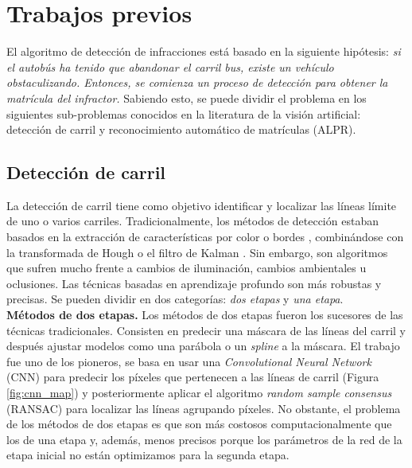 \documentclass[a4paper, oneside, onecolumn, 11pt]{article}
\begin{document}
\section{Trabajos previos}

El algoritmo de detección de infracciones está basado en la siguiente hipótesis: \textit{si el autobús ha tenido que abandonar el carril bus, existe un vehículo obstaculizando. Entonces, se comienza un proceso de detección para obtener la matrícula del infractor.} Sabiendo esto, se puede dividir el problema en los siguientes sub-problemas conocidos en la literatura de la visión artificial: detección de carril y reconocimiento automático de matrículas (ALPR).

\subsection{Detección de carril}

La detección de carril tiene como objetivo identificar y localizar las líneas límite de uno o varios carriles. Tradicionalmente, los métodos de detección estaban basados en la extracción de características por color \cite{KuoYuChiu2005} o bordes \cite{Lopez2010}, combinándose con la transformada de Hough \cite{Liu2010} o el filtro de Kalman \cite{Danescu2009}. Sin embargo, son algoritmos que sufren mucho frente a cambios de iluminación, cambios ambientales u oclusiones. Las técnicas basadas en aprendizaje profundo son más robustas y precisas. Se pueden dividir en dos categorías: \textit{dos etapas} y \textit{una etapa}.\\

\noindent\textbf{Métodos de dos etapas.} Los métodos de dos etapas \cite{Kim2014, Pan2018, Neven2018} fueron los sucesores de las técnicas tradicionales. Consisten en predecir una máscara de las líneas del carril y después ajustar modelos como una parábola o un \textit{spline} a la máscara. El trabajo \cite{Kim2014} fue uno de los pioneros, se basa en usar una \textit{Convolutional Neural Network} (CNN) para predecir los píxeles que pertenecen a las líneas de carril (Figura \ref{fig:cnn_map}) y posteriormente aplicar el algoritmo \textit{random sample consensus} (RANSAC) para localizar las líneas agrupando píxeles. No obstante, el problema de los métodos de dos etapas es que son más costosos computacionalmente que los de una etapa y, además, menos precisos porque los parámetros de la red de la etapa inicial no están optimizamos para la segunda etapa.
\end{document}
